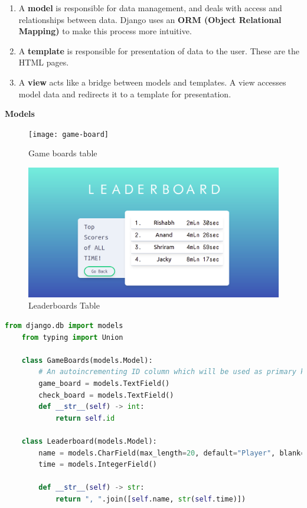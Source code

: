 \documentclass[12pt, a4paper]{report}
\begin{document}
    \begin{enumerate}
        \item A \textbf{model} is responsible for data management, and deals with access and relationships between data. Django uses an \textbf{ORM (Object Relational Mapping)} to make this process more intuitive.
        \item A \textbf{template} is responsible for presentation of data to the user. These are the HTML pages.
        \item A \textbf{view} acts like a bridge between models and templates. A view accesses model data and redirects it to a template for presentation.
    \end{enumerate}
    \textbf{Models}
    \begin{figure}[h!]
        \centering
        \texttt{[image: game-board]}
        \caption{Game boards table}
        \label{fig:game-boards}
    \end{figure}
    \begin{figure}[h!]
        \centering
        \includegraphics{leaderboard}
        \caption{Leaderboards Table}
        \label{fig:leaderboard}
    \end{figure}
    \begin{lstlisting}[language=Python, caption=mainapp/models.py]
    from django.db import models
    from typing import Union

    class GameBoards(models.Model):
        # An autoincrementing ID column which will be used as primary key is automatically added.
        game_board = models.TextField()
        check_board = models.TextField()
        def __str__(self) -> int:
            return self.id
    
    class Leaderboard(models.Model):
        name = models.CharField(max_length=20, default="Player", blank=False)
        time = models.IntegerField()
    
        def __str__(self) -> str: 
            return ", ".join([self.name, str(self.time)])
    \end{lstlisting}
\end{document}
